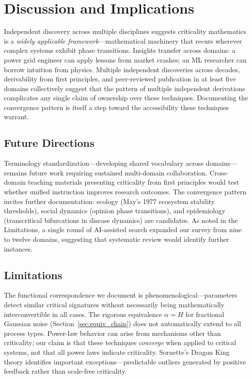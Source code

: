 \documentclass[11pt]{article}
\begin{document}
\section{Discussion and Implications}
\label{sec:discussion}

Independent discovery across multiple disciplines suggests criticality mathematics is a \textit{widely applicable framework}---mathematical machinery that recurs wherever complex systems exhibit phase transitions. Insights transfer across domains: a power grid engineer can apply lessons from market crashes; an ML researcher can borrow intuition from physics. Multiple independent discoveries across decades, derivability from first principles, and peer-reviewed publication in at least five domains collectively suggest that the pattern of multiple independent derivations complicates any single claim of ownership over these techniques. Documenting the convergence pattern is itself a step toward the accessibility these techniques warrant.

\subsection{Future Directions}

Terminology standardization---developing shared vocabulary across domains---remains future work requiring sustained multi-domain collaboration. Cross-domain teaching materials presenting criticality from first principles would test whether unified instruction improves research outcomes. The convergence pattern invites further documentation: ecology (May's 1977 ecosystem stability thresholds), social dynamics (opinion phase transitions), and epidemiology (transcritical bifurcations in disease dynamics) are candidates. As noted in the Limitations, a single round of AI-assisted search expanded our survey from nine to twelve domains, suggesting that systematic review would identify further instances.

\subsection{Limitations}
\label{sec:limitations}

The functional correspondence we document is phenomenological---parameters detect similar critical signatures without necessarily being mathematically interconvertible in all cases. The rigorous equivalence $\alpha = H$ for fractional Gaussian noise (Section~\ref{sec:equiv_chain}) does not automatically extend to all process types. Power-law behavior can arise from mechanisms other than criticality; our claim is that these techniques \textit{converge} when applied to critical systems, not that all power laws indicate criticality. Sornette's Dragon King theory \citep{sornette2009dragonking, sornette2012dragonking} identifies important exceptions---predictable outliers generated by positive feedback rather than scale-free criticality.
\end{document}
